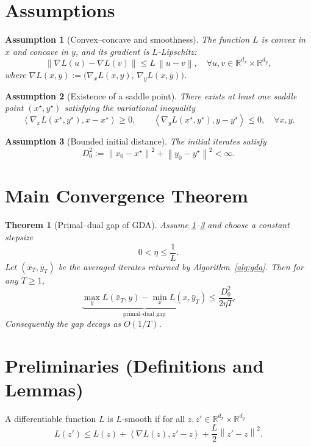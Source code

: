\documentclass{article}
\newtheorem{theorem}{Theorem}
\newtheorem{assumption}{Assumption}
\newcommand{\norm}[1]{\left\lVert#1\right\rVert}
\newcommand{\inner}[2]{\left\langle #1,#2\right\rangle}
\begin{document}
\section*{Assumptions}
\begin{assumption}[Convex–concave and smoothness]\label{assump:smooth}
The function $L$ is convex in $x$ and concave in $y$, and its gradient is $L$‑Lipschitz:
\[
\norm{\nabla L(u)-\nabla L(v)}\le L\,\norm{u-v},
\quad\forall u,v\in\mathbb{R}^{d_x}\times\mathbb{R}^{d_y},
\]
where $\nabla L(x,y) := \big(\nabla_x L(x,y),\,\nabla_y L(x,y)\big)$.
\end{assumption}
\begin{assumption}[Existence of a saddle point]\label{assump:saddle}
There exists at least one saddle point $(x^{\star},y^{\star})$ satisfying the variational inequality
\[
\inner{\nabla_x L(x^{\star},y^{\star})}{x-x^{\star}}\ge 0,\qquad
\inner{\nabla_y L(x^{\star},y^{\star})}{y-y^{\star}}\le 0,
\quad\forall x,y.
\]
\end{assumption}
\begin{assumption}[Bounded initial distance]\label{assump:bound}
The initial iterates satisfy
\[
D_0^2:=\norm{x_0-x^{\star}}^2+\norm{y_0-y^{\star}}^2<\infty .
\]
\end{assumption}

\section*{Main Convergence Theorem}
\begin{theorem}[Primal–dual gap of GDA]\label{thm:gap}
Assume \ref{assump:smooth}–\ref{assump:bound} and choose a constant stepsize 
\[
0<\eta\le\frac{1}{L}.
\]
Let $(\bar{x}_T,\bar{y}_T)$ be the averaged iterates returned by Algorithm~\ref{alg:gda}. Then for any $T\ge 1$,
\[
\underbrace{\max_{y}L(\bar{x}_T,y)-\min_{x}L(x,\bar{y}_T)}_{\displaystyle\text{primal–dual gap}}
\le \frac{D_0^2}{2\eta T}.
\]
Consequently the gap decays as $O(1/T)$.
\end{theorem}

\section*{Preliminaries (Definitions and Lemmas)}

\begin{definition}\label{def:smooth}
A differentiable function $L$ is $L$‑smooth if for all $z,z'\in\mathbb{R}^{d_x}\times\mathbb{R}^{d_y}$
\[
L(z')\le L(z)+\inner{\nabla L(z)}{z'-z}+\frac{L}{2}\norm{z'-z}^{2}.
\tag{1}
\]
\end{definition}
\end{document}
